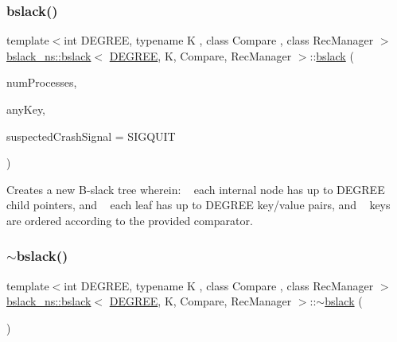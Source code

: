 \subsubsection{\texorpdfstring{bslack()}{bslack()}}
{\footnotesize\ttfamily template$<$int D\+E\+G\+R\+EE, typename K , class Compare , class Rec\+Manager $>$ \\
\hyperlink{classbslack__ns_1_1bslack}{bslack\+\_\+ns\+::bslack}$<$ \hyperlink{brown__sigouin__abtree__kcas_2adapter_8h_a5d88b17d70c985f2f2b8e987037fd6dd}{D\+E\+G\+R\+EE}, K, Compare, Rec\+Manager $>$\+::\hyperlink{classbslack__ns_1_1bslack}{bslack} (\begin{DoxyParamCaption}\item[{const int}]{num\+Processes,  }\item[{const K}]{any\+Key,  }\item[{int}]{suspected\+Crash\+Signal = {\ttfamily SIGQUIT} }\end{DoxyParamCaption})\hspace{0.3cm}{\ttfamily [inline]}}

Creates a new B-\/slack tree wherein\+: ~\newline
 each internal node has up to {\ttfamily D\+E\+G\+R\+EE} child pointers, and ~\newline
 each leaf has up to {\ttfamily D\+E\+G\+R\+EE} key/value pairs, and ~\newline
 keys are ordered according to the provided comparator. \mbox{\label{classbslack__ns_1_1bslack_a2714697604a83024eebc713ba691fbaf}} 
\subsubsection{\texorpdfstring{$\sim$bslack()}{~bslack()}}
{\footnotesize\ttfamily template$<$int D\+E\+G\+R\+EE, typename K , class Compare , class Rec\+Manager $>$ \\
\hyperlink{classbslack__ns_1_1bslack}{bslack\+\_\+ns\+::bslack}$<$ \hyperlink{brown__sigouin__abtree__kcas_2adapter_8h_a5d88b17d70c985f2f2b8e987037fd6dd}{D\+E\+G\+R\+EE}, K, Compare, Rec\+Manager $>$\+::$\sim$\hyperlink{classbslack__ns_1_1bslack}{bslack} (\begin{DoxyParamCaption}{ }\end{DoxyParamCaption})\hspace{0.3cm}{\ttfamily [inline]}}



